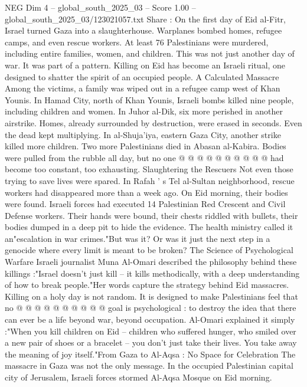 \begin{textsample}{NEG Dim 4 – global\_south\_2025\_03 – Score 1.00 – global\_south\_2025\_03/123021057.txt}  \label{ex:f4_neg_422}
Share : On the first day of Eid al-Fitr, Israel turned Gaza into a slaughterhouse.
Warplanes bombed homes, refugee camps, and even rescue workers.
At least 76 Palestinians were murdered, including entire families, women, and children.
This was not just another day of war.
It was part of a pattern.
Killing on Eid has become an Israeli ritual, one designed to shatter the spirit of an occupied people.
A Calculated Massacre Among the victims, a family was wiped out in a refugee camp west of Khan Younis.
In Hamad City, north of Khan Younis, Israeli bombs killed nine people, including children and women.
In Juhor al-Dik, six more perished in another airstrike.
Homes, already surrounded by destruction, were erased in seconds.
Even the dead kept multiplying.
In al-Shuja'iya, eastern Gaza City, another strike killed more children.
Two more Palestinians died in Abasan al-Kabira.
Bodies were pulled from the rubble all day, but no one @ @ @ @ @ @ @ @ @ @ had become too constant, too exhausting.
Slaughtering the Rescuers Not even those trying to save lives were spared.
In Rafah ' s Tel al-Sultan neighborhood, rescue workers had disappeared more than a week ago.
On Eid morning, their bodies were found.
Israeli forces had executed 14 Palestinian Red Crescent and Civil Defense workers.
Their hands were bound, their chests riddled with bullets, their bodies dumped in a deep pit to hide the evidence.
The health ministry called it an"escalation in war crimes."But was it?
Or was it just the next step in a genocide where every limit is meant to be broken?
The Science of Psychological Warfare Israeli journalist Muna Al-Omari described the philosophy behind these killings :"Israel doesn't just kill -- it kills methodically, with a deep understanding of how to break people."Her words capture the strategy behind Eid massacres.
Killing on a holy day is not random.
It is designed to make Palestinians feel that no @ @ @ @ @ @ @ @ @ @ goal is psychological : to destroy the idea that there can ever be a life beyond war, beyond occupation.
Al-Omari explained it simply :"When you kill children on Eid -- children who suffered hunger, who smiled over a new pair of shoes or a bracelet -- you don't just take their lives.
You take away the meaning of joy itself."From Gaza to Al-Aqsa : No Space for Celebration The massacre in Gaza was not the only message.
In the occupied Palestinian capital city of Jerusalem, Israeli forces stormed Al-Aqsa Mosque on Eid morning.

\end{textsample}

